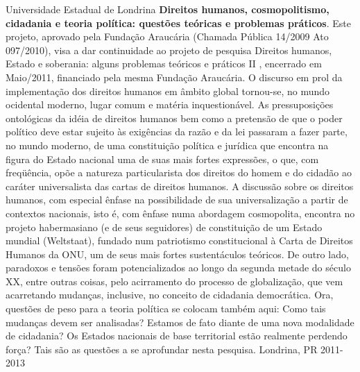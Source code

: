 \begin{cvhonors}
  \cvhonor
    {Universidade Estadual de Londrina}
    {\textbf{Direitos humanos, cosmopolitismo, cidadania e teoria política: questões teóricas e problemas práticos}. Este projeto, aprovado pela Fundação Araucária (Chamada Pública 14/2009 Ato 097/2010), visa a dar continuidade ao projeto de pesquisa Direitos humanos, Estado e soberania: alguns problemas teóricos e práticos II , encerrado em Maio/2011, financiado pela mesma Fundação Araucária. O discurso em prol da implementação dos direitos humanos em âmbito global tornou-se, no mundo ocidental moderno, lugar comum e matéria inquestionável. As pressuposições ontológicas da idéia de direitos humanos bem como a pretensão de que o poder político deve estar sujeito às exigências da razão e da lei passaram a fazer parte, no mundo moderno, de uma constituição política e jurídica que encontra na figura do Estado nacional uma de suas mais fortes expressões, o que, com freqüência, opõe a natureza particularista dos direitos do homem e do cidadão ao caráter universalista das cartas de direitos humanos. A discussão sobre os direitos humanos, com especial ênfase na possibilidade de sua universalização a partir de contextos nacionais, isto é, com ênfase numa abordagem cosmopolita, encontra no projeto habermasiano (e de seus seguidores) de constituição de um Estado mundial (Weltstaat), fundado num patriotismo constitucional à Carta de Direitos Humanos da ONU, um de seus mais fortes sustentáculos teóricos. De outro lado, paradoxos e tensões foram potencializados ao longo da segunda metade do século XX, entre outras coisas, pelo acirramento do processo de globalização, que vem acarretando mudanças, inclusive, no conceito de cidadania democrática. Ora, questões de peso para a teoria política se colocam também aqui: Como tais mudanças devem ser analisadas? Estamos de fato diante de uma nova modalidade de cidadania? Os Estados nacionais de base territorial estão realmente perdendo força? Tais são as questões a se aprofundar nesta pesquisa.}
    {Londrina, PR}
    {2011-2013}
\end{cvhonors}
